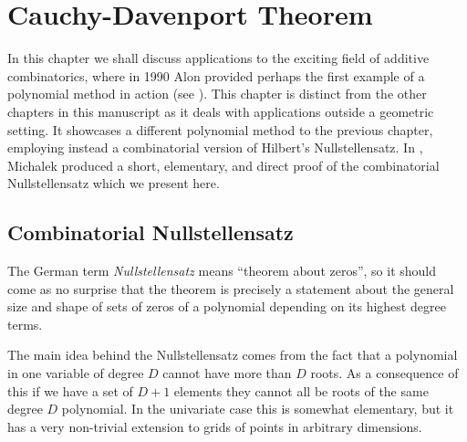 \chapter{Cauchy-Davenport Theorem \label{chap:alon}}
In this chapter we shall discuss applications to the exciting field of additive combinatorics, where in 1990 Alon provided perhaps
the first example of a polynomial method in action (see \cite{alon1999combinatorial}). This chapter is distinct from the other chapters in this manuscript as it deals with applications outside a geometric setting. It showcases a different polynomial method to the previous chapter, employing instead a combinatorial version of Hilbert's Nullstellensatz.
In \cite{michalek2010}, Michalek produced a short, elementary, and direct proof of the combinatorial Nullstellensatz which we present here.
\section{Combinatorial Nullstellensatz}
The German term \textit{Nullstellensatz} means ``theorem about zeros'', so it should come as no surprise that the theorem is 
precisely a statement about the general size and shape of sets of zeros of a polynomial depending on its highest degree terms. 

The main idea behind the Nullstellensatz comes from the fact that a polynomial in one variable of degree $D$ cannot have more than $D$ roots. 
As a consequence of this if we have a set of $D+1$ elements they cannot all be roots of the same degree $D$ polynomial. In the univariate case this is somewhat elementary, but it has a very non-trivial extension to grids of points in arbitrary dimensions. 

